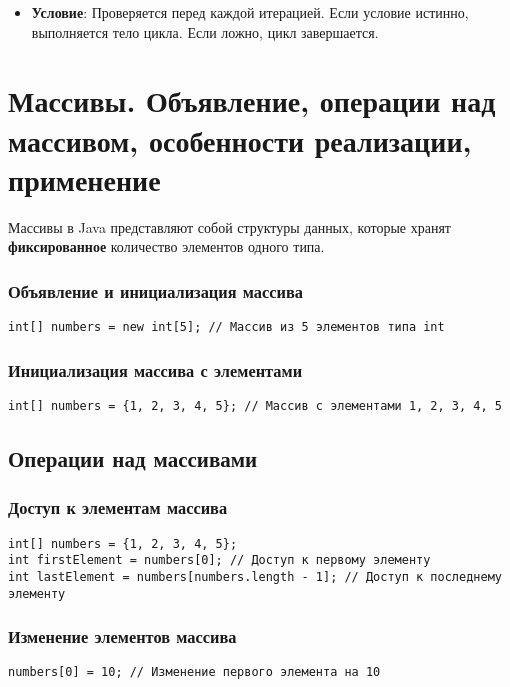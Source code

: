 \documentclass[12pt, a4paper]{article}
\begin{document}
\begin{itemize}
    \item \textbf{Условие}: Проверяется перед каждой итерацией. Если условие истинно, выполняется тело цикла. Если ложно, цикл завершается.
\end{itemize}


\section{Массивы. Объявление, операции над массивом, особенности реализации, применение}
Массивы в Java представляют собой структуры данных, которые хранят \textbf{фиксированное} количество элементов одного типа. 

\subsubsection*{Объявление и инициализация массива}
\begin{verbatim}
int[] numbers = new int[5]; // Массив из 5 элементов типа int
\end{verbatim}

\subsubsection*{Инициализация массива с элементами}
\begin{verbatim}
int[] numbers = {1, 2, 3, 4, 5}; // Массив с элементами 1, 2, 3, 4, 5
\end{verbatim}

\subsection*{Операции над массивами}
\subsubsection*{Доступ к элементам массива}
\begin{verbatim}
int[] numbers = {1, 2, 3, 4, 5};
int firstElement = numbers[0]; // Доступ к первому элементу
int lastElement = numbers[numbers.length - 1]; // Доступ к последнему элементу
\end{verbatim}

\subsubsection*{Изменение элементов массива}
\begin{verbatim}
numbers[0] = 10; // Изменение первого элемента на 10
\end{verbatim}
\end{document}
